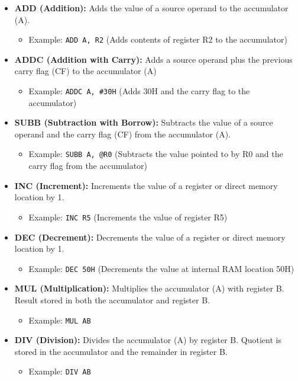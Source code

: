 \documentclass[
]{article}
\begin{document}
\begin{itemize}
\item
  \textbf{ADD (Addition):} Adds the value of a source operand to the
  accumulator (A).

  \begin{itemize}
  \item
    Example: \texttt{ADD\ A,\ R2} (Adds contents of register R2 to the
    accumulator)
  \end{itemize}
\item
  \textbf{ADDC (Addition with Carry):} Adds a source operand plus the
  previous carry flag (CF) to the accumulator (A)

  \begin{itemize}
  \item
    Example: \texttt{ADDC\ A,\ \#30H} (Adds 30H and the carry flag to
    the accumulator)
  \end{itemize}
\item
  \textbf{SUBB (Subtraction with Borrow):} Subtracts the value of a
  source operand and the carry flag (CF) from the accumulator (A).

  \begin{itemize}
  \item
    Example: \texttt{SUBB\ A,\ @R0} (Subtracts the value pointed to by
    R0 and the carry flag from the accumulator)
  \end{itemize}
\item
  \textbf{INC (Increment):} Increments the value of a register or direct
  memory location by 1.

  \begin{itemize}
  \item
    Example: \texttt{INC\ R5} (Increments the value of register R5)
  \end{itemize}
\item
  \textbf{DEC (Decrement):} Decrements the value of a register or direct
  memory location by 1.

  \begin{itemize}
  \item
    Example: \texttt{DEC\ 50H} (Decrements the value at internal RAM
    location 50H)
  \end{itemize}
\item
  \textbf{MUL (Multiplication):} Multiplies the accumulator (A) with
  register B. Result stored in both the accumulator and register B.

  \begin{itemize}
  \item
    Example: \texttt{MUL\ AB}
  \end{itemize}
\item
  \textbf{DIV (Division):} Divides the accumulator (A) by register B.
  Quotient is stored in the accumulator and the remainder in register B.

  \begin{itemize}
  \item
    Example: \texttt{DIV\ AB}
  \end{itemize}
\end{itemize}
\end{document}
